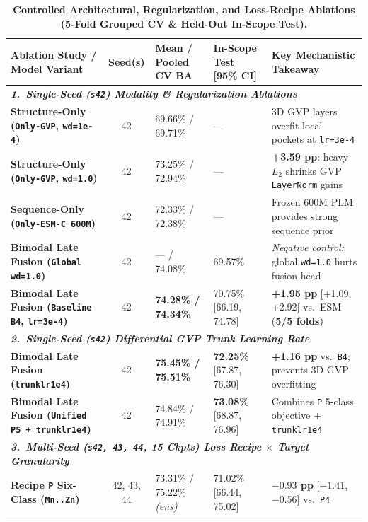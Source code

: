 \documentclass[10pt,a4paper,twocolumn]{article}
\begin{document}
\begin{table}[t!]
  \centering
  \caption{\textbf{Controlled Architectural, Regularization, and Loss-Recipe Ablations (5-Fold Grouped CV \& Held-Out In-Scope Test).}}
  \label{tab:ablations}
  \footnotesize
  \begin{tabular}{lclll}
    \toprule
    \textbf{Ablation Study / Model Variant} & \textbf{Seed(s)} & \textbf{Mean / Pooled CV BA} & \textbf{In-Scope Test [95\% CI]} & \textbf{Key Mechanistic Takeaway} \\
    \midrule
    \multicolumn{5}{l}{\textit{\textbf{1.\ Single-Seed (\texttt{s42}) Modality \& Regularization Ablations}}} \\
    \textbf{Structure-Only (\texttt{Only-GVP}, \texttt{wd=1e-4})} & 42 & 69.66\% / 69.71\% & --- & 3D GVP layers overfit local pockets at \texttt{lr=3e-4} \\
    \textbf{Structure-Only (\texttt{Only-GVP}, \texttt{wd=1.0})} & 42 & 73.25\% / 72.94\% & --- & \textbf{+3.59 pp}: heavy $L_2$ shrinks GVP \texttt{LayerNorm} gains \\
    \textbf{Sequence-Only (\texttt{Only-ESM-C 600M})} & 42 & 72.33\% / 72.38\% & --- & Frozen 600M PLM provides strong sequence prior \\
    \textbf{Bimodal Late Fusion (\texttt{Global wd=1.0})} & 42 & --- / 74.08\% & 69.57\% & \textit{Negative control:} global \texttt{wd=1.0} hurts fusion head \\
    \textbf{Bimodal Late Fusion (\texttt{Baseline B4}, \texttt{lr=3e-4})} & 42 & \textbf{74.28\% / 74.34\%} & 70.75\% [66.19, 74.78] & \textbf{+1.95 pp} [+1.09, +2.92] vs.\ ESM (\textbf{5/5 folds}) \\
    \midrule
    \multicolumn{5}{l}{\textit{\textbf{2.\ Single-Seed (\texttt{s42}) Differential GVP Trunk Learning Rate}}} \\
    \textbf{Bimodal Late Fusion (\texttt{trunklr1e4})} & 42 & \textbf{75.45\% / 75.51\%} & \textbf{72.25\%} [67.87, 76.30] & \textbf{+1.16 pp} vs.\ \texttt{B4}; prevents 3D GVP overfitting \\
    \textbf{Bimodal Late Fusion (\texttt{Unified P5 + trunklr1e4})} & 42 & 74.84\% / 74.91\% & \textbf{73.08\%} [68.87, 76.96] & Combines \texttt{P} 5-class objective + \texttt{trunklr1e4} \\
    \midrule
    \multicolumn{5}{l}{\textit{\textbf{3.\ Multi-Seed (\texttt{s42, 43, 44}, 15 Ckpts) Loss Recipe $\times$ Target Granularity}}} \\
    \textbf{Recipe \texttt{P} Six-Class (\texttt{Mn..Zn})} & 42, 43, 44 & 73.31\% / 75.22\% \textit{(ens)} & 71.02\% [66.44, 75.02] & \textbf{$-0.93$ pp} [$-1.41$, $-0.56$] vs.\ \texttt{P4} \\

\end{tabular}
\end{table}
\end{document}
